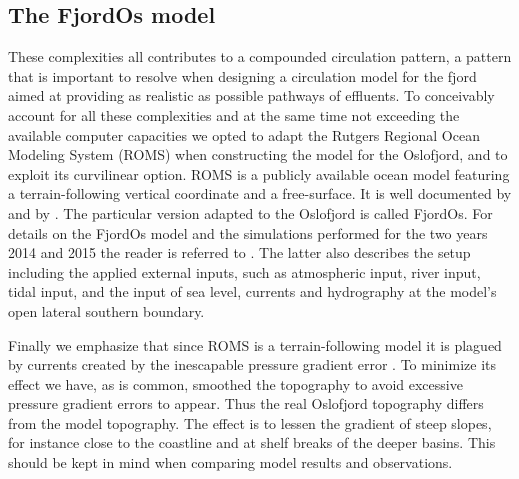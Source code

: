 \subsection{The FjordOs model}
These complexities all contributes to a compounded circulation pattern, a pattern that is important to resolve when designing a circulation model for the fjord aimed at providing as realistic as possible pathways of effluents. To conceivably account for all these complexities and at the same time not exceeding the available computer capacities we opted to adapt the Rutgers Regional Ocean Modeling System (ROMS) when constructing the model for the Oslofjord, and to exploit its curvilinear option. ROMS is a publicly available ocean model featuring a terrain-following vertical coordinate and a free-surface. It is well documented by \cite{haidv:etal:2008} and by \cite{shche:mcwil:2003,shche:mcwil:2005,shche:mcwil:2009}. The particular version adapted to the Oslofjord is called FjordOs. For details on the FjordOs model and the simulations performed for the two years 2014 and 2015 the reader is referred to \cite{roed:etal:2016}. The latter also describes the setup including the applied external inputs, such as atmospheric input, river input, tidal input, and the input of sea level, currents and hydrography at the model's open lateral southern boundary.

Finally we emphasize that since ROMS is a terrain-following model it is plagued by currents created by the inescapable pressure gradient error \citep{haney:1991, bernt:thiem:2007}. To minimize its effect we have, as is common, smoothed the topography to avoid excessive pressure gradient errors to appear. Thus the real Oslofjord topography differs from the model topography. The effect is to lessen the gradient of steep slopes, for instance close to the coastline and at shelf breaks of the deeper basins. This should be kept in mind when comparing model results and observations.   


